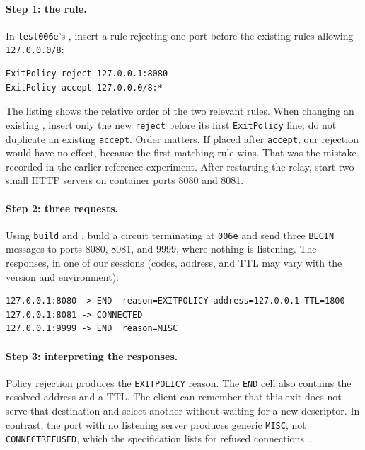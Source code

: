 \paragraph{Step 1: the rule.} In \texttt{test006e}'s , insert a rule rejecting one port before the existing rules allowing \texttt{127.0.0.0/8}:
\begin{lstlisting}[numbers=none]
ExitPolicy reject 127.0.0.1:8080
ExitPolicy accept 127.0.0.0/8:*
\end{lstlisting}
The listing shows the relative order of the two relevant rules. When changing an existing , insert only the new \texttt{reject} before its first \texttt{ExitPolicy} line; do not duplicate an existing \texttt{accept}. Order matters. If placed after \texttt{accept}, our rejection would have no effect, because the first matching rule wins. That was the mistake recorded in the earlier reference experiment. After restarting the relay, start two small HTTP servers on container ports 8080 and 8081.

\paragraph{Step 2: three requests.} Using \texttt{build} and , build a circuit terminating at \texttt{006e} and send three \texttt{BEGIN} messages to ports 8080, 8081, and 9999, where nothing is listening. The responses, in one of our sessions (codes, address, and TTL may vary with the version and environment):
\begin{lstlisting}[numbers=none]
127.0.0.1:8080 -> END  reason=EXITPOLICY address=127.0.0.1 TTL=1800
127.0.0.1:8081 -> CONNECTED
127.0.0.1:9999 -> END  reason=MISC
\end{lstlisting}

\paragraph{Step 3: interpreting the responses.} Policy rejection produces the \texttt{EXITPOLICY} reason. The \texttt{END} cell also contains the resolved address and a TTL. The client can remember that this exit does not serve that destination and select another without waiting for a new descriptor. In contrast, the port with no listening server produces generic \texttt{MISC}, not \texttt{CONNECTREFUSED}, which the specification lists for refused connections~.

